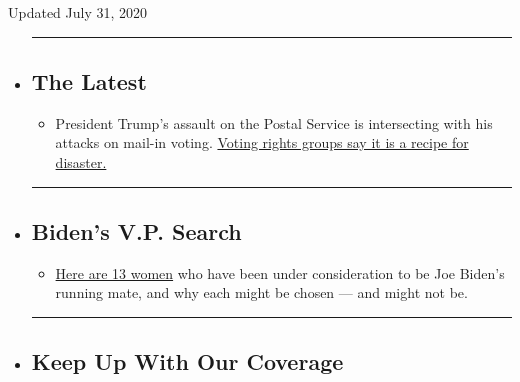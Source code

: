 Updated July 31, 2020

\begin{itemize}
\item
  \begin{center}\rule{0.5\linewidth}{\linethickness}\end{center}

  \hypertarget{the-latest}{%
  \subsection{The Latest}\label{the-latest}}

  \begin{itemize}
  \tightlist
  \item
    President Trump's assault on the Postal Service is intersecting with
    his attacks on mail-in voting.
    \href{https://www.nytimes.com/2020/07/31/us/politics/trump-usps-mail-delays.html?action=click\&pgtype=Article\&state=default\&region=BELOW_MAIN_CONTENT\&context=storylines_guide}{Voting
    rights groups say it is a recipe for disaster.}
  \end{itemize}
\item
  \begin{center}\rule{0.5\linewidth}{\linethickness}\end{center}

  \hypertarget{bidens-vp-search}{%
  \subsection{Biden's V.P. Search}\label{bidens-vp-search}}

  \begin{itemize}
  \tightlist
  \item
    \href{https://www.nytimes.com/article/biden-vice-president-2020.html?action=click\&pgtype=Article\&state=default\&region=BELOW_MAIN_CONTENT\&context=storylines_guide}{Here
    are 13 women} who have been under consideration to be Joe Biden's
    running mate, and why each might be chosen --- and might not be.
  \end{itemize}
\item
  \begin{center}\rule{0.5\linewidth}{\linethickness}\end{center}

  \hypertarget{keep-up-with-our-coverage}{%
  \subsection{Keep Up With Our
  Coverage}\label{keep-up-with-our-coverage}}


\end{itemize}
